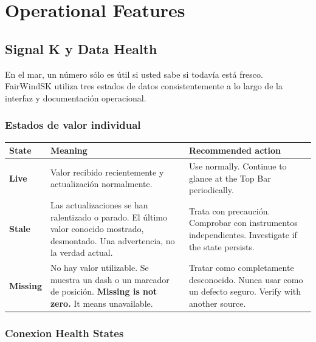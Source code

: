 \part{Operational Features}

\chapter{Signal K y Data Health}
\label{ch:datahealth}

En el mar, un número sólo es útil si usted sabe si todavía está fresco.
FairWindSK utiliza tres estados de datos consistentemente a lo largo de la interfaz
y documentación operacional.

\section{Estados de valor individual}

\begin{longtable}{L{2.2cm}L{5.4cm}L{6.1cm}}
\toprule
{}
\color{white}\sffamily\bfseries State &
\color{white}\sffamily\bfseries Meaning &
\color{white}\sffamily\bfseries Recommended action \\
\midrule
\textbf{Live}    &
Valor recibido recientemente y actualización normalmente.&
  Use normally. Continue to glance at the Top Bar periodically. \\
\textbf{Stale}   &
Las actualizaciones se han ralentizado o parado. El último valor conocido mostrado, desmontado.
Una advertencia, no la verdad actual.&
Trata con precaución. Comprobar con instrumentos independientes.
  Investigate if the state persists. \\
\textbf{Missing} &
No hay valor utilizable. Se muestra un dash o un marcador de posición.
  \textbf{Missing is not zero.} It means unavailable. &
Tratar como completamente desconocido. Nunca usar como un defecto seguro.
  Verify with another source. \\
\bottomrule
\end{longtable}

\section{Conexion Health States}

